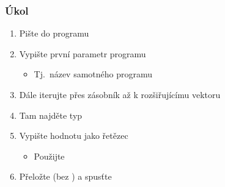 \begin{frame}
  \frametitle{Úkol}

  \begin{enumerate}
    \item Pište do programu 

    \item Vypište první parametr programu
    \begin{itemize}
      \item Tj.\ název samotného programu
    \end{itemize}

    \item Dále iterujte přes zásobník až k rozšiřujícímu vektoru
    \item Tam najděte typ 
    \item Vypište hodnotu jako řetězec
    \begin{itemize}
      \item Použijte 
    \end{itemize}

    \item Přeložte (bez ) a spusťte
  \end{enumerate}

\end{frame}


